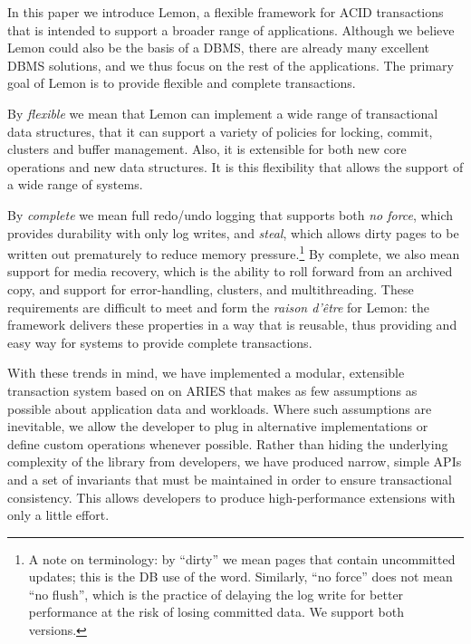 \documentclass[10pt,letterpaper,twocolumn,english]{article}
\newcommand{\yad}{Lemon\xspace}
\begin{document}
In this paper we introduce \yad, a flexible framework for ACID
transactions that is intended to support a broader range of
applications.  Although we believe \yad could also be the basis of a
DBMS, there are already many excellent DBMS solutions, and we thus
focus on the rest of the applications.  The primary goal of \yad is to
provide flexible and complete transactions.

By {\em flexible} we mean that \yad can implement a wide range of
transactional data structures, that it can support a variety of
policies for locking, commit, clusters and buffer management. Also,
it is extensible for both new core operations and new data
structures.  It is this flexibility that allows the support of a wide
range of systems.

By {\em complete} we mean full redo/undo logging that supports both
{\em no force}, which provides durability with only log writes, and
{\em steal}, which allows dirty pages to be written out prematurely to
reduce memory pressure.\footnote{A note on terminology: by ``dirty''
we mean pages that contain uncommitted updates; this is the DB use of
the word. Similarly, ``no force'' does not mean ``no flush'', which is
the practice of delaying the log write for better performance at the
risk of losing committed data. We support both versions.} By complete,
we also mean support for media recovery, which is the ability to roll
forward from an archived copy, and support for error-handling,
clusters, and multithreading.  These requirements are difficult to
meet and form the {\em raison d'\^{e}tre} for \yad: the framework delivers
these properties in a way that is reusable, thus providing and easy
way for systems to provide complete transactions.

With these trends in mind, we have implemented a modular, extensible
transaction system based on on ARIES that makes as few assumptions as
possible about application data and workloads. Where such
assumptions are inevitable, we allow 
the developer to plug in alternative implementations or
define custom operations whenever possible. Rather than hiding the underlying complexity
of the library from developers, we have produced narrow, simple APIs
and a set of invariants that must be maintained in order to ensure
transactional consistency.  This allows developers to produce
high-performance extensions with only a little effort.  
\end{document}
